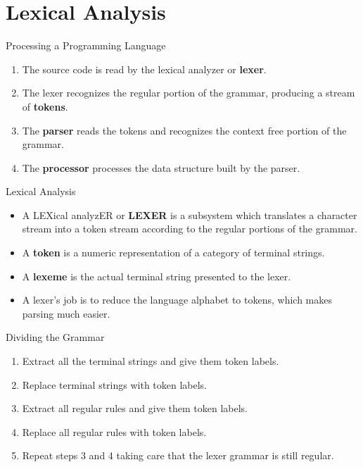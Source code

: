 \documentclass[handout]{beamer}
\begin{document}
\section {Lexical Analysis}
\begin{frame}{Processing a Programming Language}

\vspace{1cm}
\begin{enumerate}
    \item The source code is read by the lexical analyzer or {\bf lexer}.
    \item The lexer recognizes the regular portion of the grammar, producing a stream of {\bf tokens}.
    \item The {\bf parser} reads the tokens and recognizes the context free portion of the grammar.
    \item The {\bf processor} processes the data structure built by the parser.
\end{enumerate}
\end{frame}

\begin{frame}{Lexical Analysis}
\begin{center}
\end{center}

\begin{itemize}
    \item A LEXical analyzER or {\bf LEXER} is a subsystem which translates a character stream into a token stream according to the regular portions of the grammar.
    \item A {\bf token} is a numeric representation of a category of terminal strings.
    \item A {\bf lexeme} is the actual terminal string presented to the lexer.
    \item A lexer's job is to reduce the language alphabet to tokens, which makes parsing much easier.
\end{itemize}
\end{frame}

\begin{frame}{Dividing the Grammar}
    \begin{enumerate}
        \item Extract all the terminal strings and give them token labels.
        \item Replace terminal strings with token labels.
        \item Extract all regular rules and give them token labels.
        \item Replace all regular rules with token labels.
        \item Repeat steps 3 and 4 taking care that the lexer grammar is still regular.
    \end{enumerate}
\end{frame}
\end{document}
